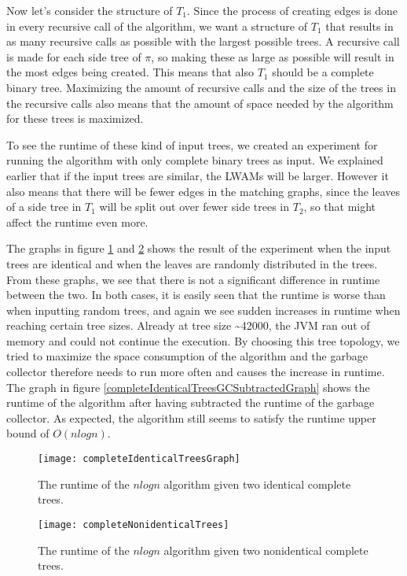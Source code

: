 Now let's consider the structure of $T_1$. Since the process of creating edges is done in every recursive call of the algorithm, we want a structure of $T_1$ that results in as many recursive calls as possible with the largest possible trees. A recursive call is made for each side tree of $\pi$, so making these as large as possible will result in the most edges being created. This means that also $T_1$ should be a complete binary tree. Maximizing the amount of recursive calls and the size of the trees in the recursive calls also means that the amount of space needed by the algorithm for these trees is maximized.

To see the runtime of these kind of input trees, we created an experiment for running the algorithm with only complete binary trees as input. We explained earlier that if the input trees are similar, the LWAMs will be larger. However it also means that there will be fewer edges in the matching graphs, since the leaves of a side tree in $T_1$ will be split out over fewer side trees in $T_2$, so that might affect the runtime even more.

The graphs in figure \ref{completeIdenticalTreesGraph} and \ref{completeNonidenticalTreesGraph} shows the result of the experiment when the input trees are identical and when the leaves are randomly distributed in the trees. From these graphs, we see that there is not a significant difference in runtime between the two. In both cases, it is easily seen that the runtime is worse than when inputting random trees, and again we see sudden increases in runtime when reaching certain tree sizes. Already at tree size \textasciitilde 42000, the JVM ran out of memory and could not continue the execution. 
By choosing this tree topology, we tried to maximize the space consumption of the algorithm and the garbage collector therefore needs to run more often and causes the increase in runtime. The graph in figure \ref{completeIdenticalTreesGCSubtractedGraph} shows the runtime of the algorithm after having subtracted the runtime of the garbage collector. As expected, the algorithm still seems to satisfy the runtime upper bound of $O(nlogn)$.

\begin{figure}
	\texttt{[image: completeIdenticalTreesGraph]}
	\caption{The runtime of the $nlogn$ algorithm given two identical complete trees.}
	\label{completeIdenticalTreesGraph}
\end{figure}
\begin{figure}
	\texttt{[image: completeNonidenticalTrees]}
	\caption{The runtime of the $nlogn$ algorithm given two nonidentical complete trees.}
	\label{completeNonidenticalTreesGraph}
\end{figure}

